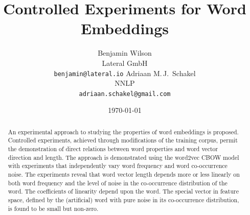 \documentclass{article} %
\title{Controlled Experiments for Word Embeddings}
\author{
 	Benjamin Wilson\\
	Lateral GmbH\\
	\texttt{benjamin@lateral.io}
	\And
	Adriaan M.\,J.\, Schakel\\
	NNLP\\
	\texttt{adriaan.schakel@gmail.com}
 }
\date{\today}
\begin{document}
\graphicspath{{../outputs/}}
\maketitle

\begin{abstract}
	An experimental approach to studying the properties of word
        embeddings is proposed.  Controlled experiments, achieved
        through modifications of the training corpus, permit the
        demonstration of direct relations between word properties and
        word vector direction and length.  The approach is demonstrated
        using the word2vec CBOW model with experiments that
        independently vary word frequency and word co-occurrence noise.
        The experiments reveal that word vector length depends more or
        less linearly on both word frequency and the level of noise in
        the co-occurrence distribution of the word.  The coefficients of
        linearity depend upon the word.  The special vector in feature
        space, defined by the (artificial) word with pure noise in its
        co-occurrence distribution, is found to be small but non-zero.
\end{abstract} 
\end{document}
